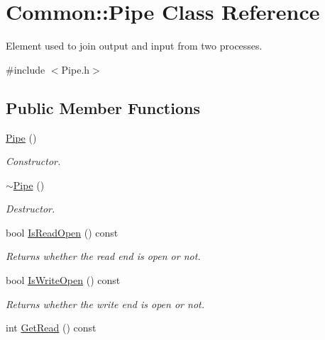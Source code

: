 \hypertarget{class_common_1_1_pipe}{\section{Common\-:\-:Pipe Class Reference}
\label{class_common_1_1_pipe}
}


Element used to join output and input from two processes.  




{\ttfamily \#include $<$Pipe.\-h$>$}

\subsection*{Public Member Functions}
\begin{DoxyCompactItemize}
\item 
\hyperlink{class_common_1_1_pipe_a91ddad07e89d5585b1cf27fa7860e201}{Pipe} ()
\begin{DoxyCompactList}\small\item\em Constructor. \end{DoxyCompactList}\item 
\hypertarget{class_common_1_1_pipe_af4519cc3f1f13857a724db7b2220eefa}{\hyperlink{class_common_1_1_pipe_af4519cc3f1f13857a724db7b2220eefa}{$\sim$\-Pipe} ()}\label{class_common_1_1_pipe_af4519cc3f1f13857a724db7b2220eefa}

\begin{DoxyCompactList}\small\item\em Destructor. \end{DoxyCompactList}\item 
\hypertarget{class_common_1_1_pipe_abff5b09eb4aa62f756dc5137239cc450}{bool \hyperlink{class_common_1_1_pipe_abff5b09eb4aa62f756dc5137239cc450}{Is\-Read\-Open} () const }\label{class_common_1_1_pipe_abff5b09eb4aa62f756dc5137239cc450}

\begin{DoxyCompactList}\small\item\em Returns whether the read end is open or not. \end{DoxyCompactList}\item 
\hypertarget{class_common_1_1_pipe_ab8d088b877cbaea297f6eb48fe790b46}{bool \hyperlink{class_common_1_1_pipe_ab8d088b877cbaea297f6eb48fe790b46}{Is\-Write\-Open} () const }\label{class_common_1_1_pipe_ab8d088b877cbaea297f6eb48fe790b46}

\begin{DoxyCompactList}\small\item\em Returns whether the write end is open or not. \end{DoxyCompactList}\item 
\hypertarget{class_common_1_1_pipe_a5af565c0e6f067bef9a458c54bfe22a3}{int \hyperlink{class_common_1_1_pipe_a5af565c0e6f067bef9a458c54bfe22a3}{Get\-Read} () const }\label{class_common_1_1_pipe_a5af565c0e6f067bef9a458c54bfe22a3}


\end{DoxyCompactItemize}
